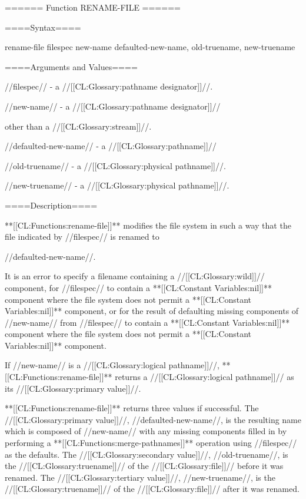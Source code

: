 ====== Function RENAME-FILE ======

====Syntax====

\DefunWithValues rename-file {filespec new-name} {defaulted-new-name, old-truename, new-truename}

====Arguments and Values====

//filespec// - a //[[CL:Glossary:pathname designator]]//.

//new-name// - a //[[CL:Glossary:pathname designator]]//

other than a //[[CL:Glossary:stream]]//.

//defaulted-new-name// - a //[[CL:Glossary:pathname]]//

//old-truename// - a //[[CL:Glossary:physical pathname]]//.

//new-truename// - a //[[CL:Glossary:physical pathname]]//.

====Description====

**[[CL:Functions:rename-file]]** modifies the file system in such a way that the file indicated by //filespec// is renamed to

//defaulted-new-name//.

It is an error to specify a filename containing a //[[CL:Glossary:wild]]// component, for //filespec// to contain a **[[CL:Constant Variables:nil]]** component where the file system does not permit a **[[CL:Constant Variables:nil]]** component, or for the result of defaulting missing components of //new-name// from //filespec// to contain a **[[CL:Constant Variables:nil]]** component where the file system does not permit a **[[CL:Constant Variables:nil]]** component.

If //new-name// is a //[[CL:Glossary:logical pathname]]//, **[[CL:Functions:rename-file]]** returns a //[[CL:Glossary:logical pathname]]// as its //[[CL:Glossary:primary value]]//.

**[[CL:Functions:rename-file]]** returns three values if successful. The //[[CL:Glossary:primary value]]//, //defaulted-new-name//, is the resulting name which is composed of //new-name// with any missing components filled in by performing a **[[CL:Functions:merge-pathnames]]** operation using //filespec// as the defaults. The //[[CL:Glossary:secondary value]]//, //old-truename//, is the //[[CL:Glossary:truename]]// of the //[[CL:Glossary:file]]// before it was renamed. The //[[CL:Glossary:tertiary value]]//, //new-truename//, is the //[[CL:Glossary:truename]]// of the //[[CL:Glossary:file]]// after it was renamed.


